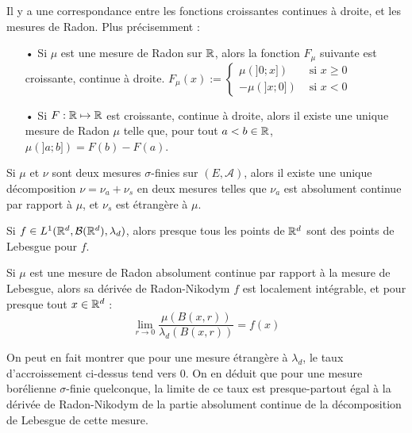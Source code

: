 \documentclass[11pt,a4paper]{article}
\begin{document}
\begin{propstar}
Il y a une correspondance entre les fonctions croissantes continues à droite, et les mesures de Radon. Plus précisemment :
\begin{itemize}
\item[•] Si $\mu$ est une mesure de Radon sur $\mathbb R$, alors la fonction $F_{\mu}$ suivante est croissante, continue à droite.
$\displaystyle F_{\mu}(x) := \begin{cases} \mu(]0;x]) & \text{ si } x \geq 0  \\ -\mu(]x;0]) & \text{ si } x < 0 \end{cases}$
\item[•] Si $F : \mathbb R \mapsto \mathbb R$ est croissante, continue à droite, alors il existe une unique mesure de Radon $\mu$ telle que, pour tout $a<b \in \mathbb R$, $\mu(]a;b])=F(b)-F(a)$.
\end{itemize}
\end{propstar}

\begin{corstar}
Si $\mu$ et $\nu$ sont deux mesures $\sigma$-finies sur $(E,\mathcal{A})$, alors il existe une unique décomposition $\nu = \nu_a + \nu_s$ en deux mesures telles que $\nu_a$ est absolument continue par rapport à $\mu$, et $\nu_s$ est étrangère à $\mu$. 
\end{corstar}

\begin{propstar}
Si $f \in L^1(\mathbb R^d,\mathcal{B}(\mathbb R^d),\lambda_d)$, alors presque tous les points de $\mathbb R^d$ sont des points de Lebesgue pour $f$.
\end{propstar}

\begin{corstar}
Si $\mu$ est une mesure de Radon absolument continue par rapport à la mesure de Lebesgue, alors sa dérivée de Radon-Nikodym $f$ est localement intégrable, et pour presque tout $x\in \mathbb R^d$ :
\[\lim\limits_{r \to 0}  \frac{\mu(B(x,r))}{\lambda_d(B(x,r))} = f(x)\]
\end{corstar}

\begin{rmq}
On peut en fait montrer que pour une mesure étrangère à $\lambda_d$, le taux d'accroissement ci-dessus tend vers 0. On en déduit que pour une mesure borélienne $\sigma$-finie quelconque, la limite de ce taux est presque-partout égal à la dérivée de Radon-Nikodym de la partie absolument continue de la décomposition de Lebesgue de cette mesure.
\end{rmq}
\end{document}
